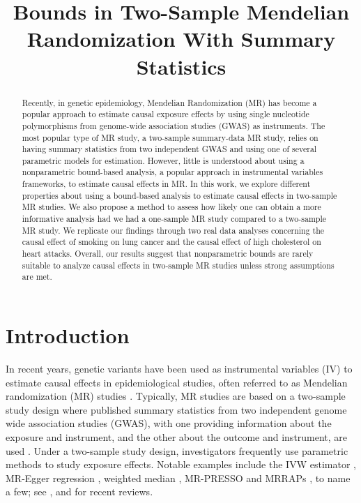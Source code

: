 \documentclass[
]{article}
\title{Bounds in Two-Sample Mendelian Randomization With Summary Statistics}
\author{}
\date{\vspace{-2.5em}}
\theoremstyle{plain}
\begin{document}
\maketitle
\begin{abstract}
Recently, in genetic epidemiology, Mendelian Randomization (MR) has become a popular approach to estimate causal exposure effects by using single nucleotide polymorphisms from genome-wide association studies (GWAS) as instruments. The most popular type of MR study, a two-sample summary-data MR study, relies on having summary statistics from two independent GWAS and using one of several parametric models for estimation. However, little is understood about using a nonparametric bound-based analysis, a popular approach in instrumental variables frameworks, to estimate causal effects in MR. In this work, we explore different properties about using a bound-based analysis to estimate causal effects in two-sample MR studies. We also propose a method to assess how likely one can obtain a more informative analysis had we had a one-sample MR study compared to a two-sample MR study. We replicate our findings through two real data analyses concerning the causal effect of smoking on lung cancer and the causal effect of high cholesterol on heart attacks. Overall, our results suggest that nonparametric bounds are rarely suitable to analyze causal effects in two-sample MR studies unless strong assumptions are met.
\end{abstract}

\newpage

\hypertarget{introduction}{%
\section{Introduction}\label{introduction}}

In recent years, genetic variants have been used as instrumental variables (IV) to estimate causal effects in epidemiological studies, often referred to as Mendelian randomization (MR) studies \autocite{davey_smith_mendelian_2003,lawlor_mendelian_2008}. Typically, MR studies are based on a two-sample study design where published summary statistics from two independent genome wide association studies (GWAS), with one providing information about the exposure and instrument, and the other about the outcome and instrument, are used \autocite{burgess_mendelian_2013,burgess_using_2015,davies_reading_2018}. Under a two-sample study design, investigators frequently use parametric methods to study exposure effects. Notable examples include the IVW estimator \autocite{burgess_mendelian_2013}, MR-Egger regression \autocite{bowden_assessing_2016}, weighted median \autocite{bowden_consistent_2016}, MR-PRESSO \autocite{verbanck_detection_2018} and MRRAPs \autocite{zhao_statistical_2020}, to name a few; see \textcite{burgess_mendelian_2015}, \textcite{burgess_review_2017} and \textcite{slob_comparison_2020} for recent reviews.
\end{document}
